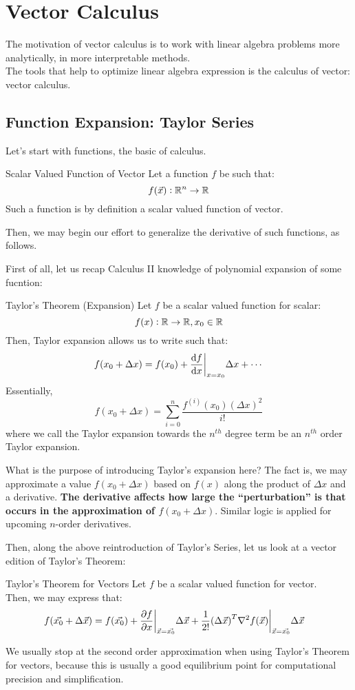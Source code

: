 \chapter{Vector Calculus}
The motivation of vector calculus is to work with linear algebra problems more analytically, in more interpretable methods. \\
The tools that help to optimize linear algebra expression is the calculus of vector: vector calculus.

\section{Function Expansion: Taylor Series}
Let's start with functions, the basic of calculus.
\begin{ln-define}{Scalar Valued Function of Vector}{}
    Let a function $f$ be such that:
    \[
        f(\vec{x}): \mathbb{R}^n \rightarrow \mathbb{R}
    \]
    Such a function is by definition a scalar valued function of vector.
\end{ln-define}
Then, we may begin our effort to generalize the derivative of such functions, as follows.

First of all, let us recap Calculus II knowledge of polynomial expansion of some fucntion:
\begin{ln-theorem}{Taylor's Theorem (Expansion)}{}
    Let $f$ be a scalar valued function for scalar:
    \[
        f(x) : \mathbb{R} \rightarrow \mathbb{R}, x_0 \in \mathbb{R}
    \]
    Then, Taylor expansion allows us to write such that:
    \[
        f(x_0 + \Delta x) = f(x_0) + \dv{f}{x} \bigg|_{x = x_0} \Delta x + \cdots
    \]
    Essentially, 
    \[
        f(x_0 + \Delta x) = \sum_{i = 0}^n \frac{f^{(i)}(x_0) {(\Delta x)}^2}{i!}
    \]
    where we call the Taylor expansion towards the $n^{th}$ degree term be an $n^{th}$ order Taylor expansion.
\end{ln-theorem}
What is the purpose of introducing Taylor's expansion here? The fact is, we may approximate a value $f(x_0 + \Delta x)$ based on $f(x)$ along the product of $\Delta x$ and a derivative.
\textbf{The derivative affects how large the ``perturbation'' is that occurs in the approximation of $f(x_0 + \Delta x)$}.
Similar logic is applied for upcoming $n$-order derivatives.

Then, along the above reintroduction of Taylor's Series, let us look at a vector edition of Taylor's Theorem:
\begin{ln-theorem}{Taylor's Theorem for Vectors}{}
    Let $f$ be a scalar valued function for vector. \\
    Then, we may express that:
    \begin{align*}
        f(\vec{x_0} + \Delta \vec{x})
        &= f(\vec{x_0}) + \pdv{f}{x} \bigg|_{\vec{x} = \vec{x_0}} \Delta \vec{x} + \frac{1}{2!} {(\Delta \vec{x})}^T \nabla^2 f(\vec{x}) \bigg|_{\vec{x} = \vec{x_0}} \Delta \vec{x}
    \end{align*}
\end{ln-theorem}
We usually stop at the second order approximation when using Taylor's Theorem for vectors, because this is usually a good equilibrium point for computational precision and simplification.

